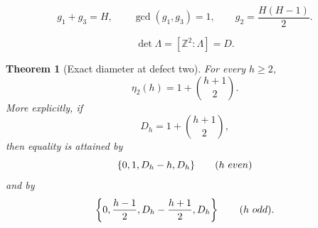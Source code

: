 \documentclass[10pt,a4paper]{amsart}
\newtheorem{theorem}{Theorem}
\newcommand{\Z}{\mathbb Z}
\begin{document}
\begin{equation}
 g_1+g_3=H,\qquad
 \gcd(g_1,g_3)=1,\qquad
 g_2=\frac{H(H-1)}2.
\end{equation}

\begin{equation}\label{eq:fourpointdeterminant}
 \det\Lambda=[\Z^2:\Lambda]=D.
\end{equation}

\begin{theorem}[Exact diameter at defect two]
\label{thm:defecttwodiameter}
For every $h\geq2$,
\begin{equation}\label{eq:defecttwodiameter}
 \boxed{\qquad \eta_2(h)=1+\binom{h+1}{2}.\qquad}
\end{equation}
More explicitly, if
\[
 D_h=1+\binom{h+1}{2},
\]
then equality is attained by
\[
 \{0,1,D_h-h,D_h\}\qquad(h\ \textup{even})
\]
and by
\[
 \left\{0,\frac{h-1}{2},D_h-\frac{h+1}{2},D_h\right\}
 \qquad(h\ \textup{odd}).
\]
\end{theorem}
\end{document}

